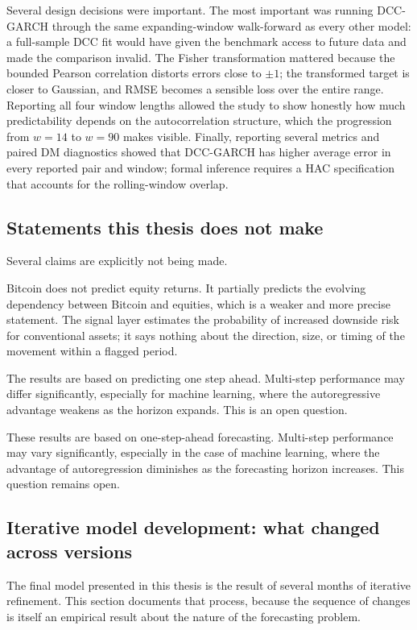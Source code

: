 Several design decisions were important. The most important was running DCC-GARCH through the same expanding-window walk-forward as every other model: a full-sample DCC fit would have given the benchmark access to future data and made the comparison invalid. The Fisher transformation mattered because the bounded Pearson correlation distorts errors close to $\pm 1$; the transformed target is closer to Gaussian, and RMSE becomes a sensible loss over the entire range. Reporting all four window lengths allowed the study to show honestly how much predictability depends on the autocorrelation structure, which the progression from $w=14$ to $w=90$ makes visible. Finally, reporting several metrics and paired DM diagnostics showed that DCC-GARCH has higher average error in every reported pair and window; formal inference requires a HAC specification that accounts for the rolling-window overlap.

\subsection{Statements this thesis does not make}

Several claims are explicitly not being made.

Bitcoin does not predict equity returns. It partially predicts the evolving dependency between Bitcoin and equities, which is a weaker and more precise statement. The signal layer estimates the probability of increased downside risk for conventional assets; it says nothing about the direction, size, or timing of the movement within a flagged period.

The results are based on predicting one step ahead. Multi-step performance may differ significantly, especially for machine learning, where the autoregressive advantage weakens as the horizon expands. This is an open question.

These results are based on one-step-ahead forecasting. Multi-step performance may vary significantly, especially in the case of machine learning, where the advantage of autoregression diminishes as the forecasting horizon increases. This question remains open.

\subsection{Iterative model development: what changed across versions}
\label{subsec:iterations}

The final model presented in this thesis is the result of several months of iterative refinement. This section documents that process, because the sequence of changes is itself an empirical result about the nature of the forecasting problem.

